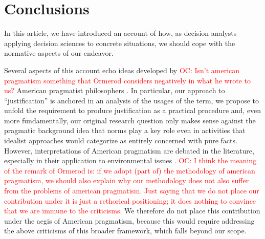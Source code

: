 \documentclass[preprint, french, english, 11pt, authoryear]{elsarticle}%
\newcommand{\commentOC}[1]{\textcolor{red}{OC: #1}}
\begin{document}
\section{Conclusions}
\label{sec:concl}
In this article, we have introduced an account of how, as decision analysts applying decision sciences to concrete situations, we should cope with the normative aspects of our endeavor. %
\begin{changebar}Several aspects of this account echo ideas developed by \commentOC{Isn’t american pragmatism something that Ormerod considers negatively in what he wrote to us?} American pragmatist philosophers \citep{ormerod_history_2006}. 
In particular, our approach to ``justification'' is anchored in an analysis of the usages of the term, we propose to unfold the requirement to produce justification as a practical procedure and, even more fundamentally, our original research question only makes sense against the pragmatic background idea that norms play a key role even in activities that idealist approaches would categorize as entirely concerned with pure facts.
However, interpretations of American pragmatism are debated in the literature, especially in their application to environmental issues \citep{spash_new_2009}.
\commentOC{I think the meaning of the remark of Ormerod is: if we adopt (part of) the methodology of american pragmatism, we should also explain why our methodology does not also suffer from the problems of american pragmatism. Just saying that we do not place our contribution under it is just a rethorical positioning; it does nothing to convince that we are immune to the criticisms.} We therefore do not place this contribution under the aegis of American pragmatism, because this would require addressing the above criticisms of this broader framework, which falls beyond our scope.\end{changebar}

\end{document}
